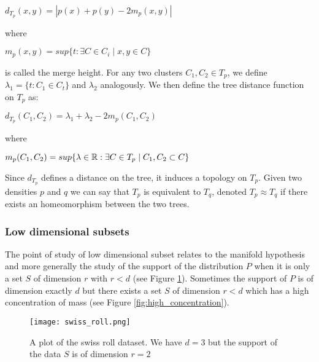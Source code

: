 \documentclass[12pt, a4paper]{article}
\begin{document}
  \begin{center}
    $d_{T_p}(x,y) = |p(x) + p(y) - 2m_p(x,y)|$
  \end{center}

  where

  \begin{center}
    $m_p(x,y) = sup \lbrace t : \exists C\in C_i \mid x,y \in C \rbrace$    
  \end{center}
  
  is called the merge height. For any two clusters $C_1, C_2 \in T_p$, we define $\lambda_1 = \lbrace t: C_1 \in C_t \rbrace$ and $\lambda_2$ analogously. We then define the tree distance function on $T_p$ as:

  \begin{center}
    $d_{T_p}(C_1,C_2) = \lambda_1 + \lambda_2 - 2m_p(C_1,C_2)$
  \end{center}

  where

  \begin{center}
    $m_p(C_1,C_2) = sup \lbrace \lambda \in \mathbb{R} : \exists C \in T_p \mid C_1, C_2 \subset C \rbrace$
  \end{center}

  Since $d_{T_p}$ defines a distance on the tree, it induces a topology on $T_p$. Given two densities $p$ and $q$ we can say that $T_p$ is equivalent to $T_q$, denoted $T_p \approx T_q$ if there exists an homeomorphism between the two trees.

\subsubsection{Low dimensional subsets}

The point of study of low dimensional subset relates to the manifold hypothesis and more generally the study of the support of the distribution $P$ when it is only a set $S$ of dimension $r$ with $r < d$ (see Figure \ref{fig:swiss_roll}). Sometimes the support of $P$ is of dimension exactly $d$ but there exists a set $S$ of dimension $r < d$ which has a high concentration of mass (see Figure \ref{fig:high_concentration}).\\  

  \begin{figure}[p]
    \centering
  \texttt{[image: swiss\_roll.png]}
  \caption{A plot of the swiss roll dataset. We have $d=3$ but the support of the data $S$ is of dimension $r=2$}
  \label{fig:swiss_roll}
\end{figure}
  
\end{document}
